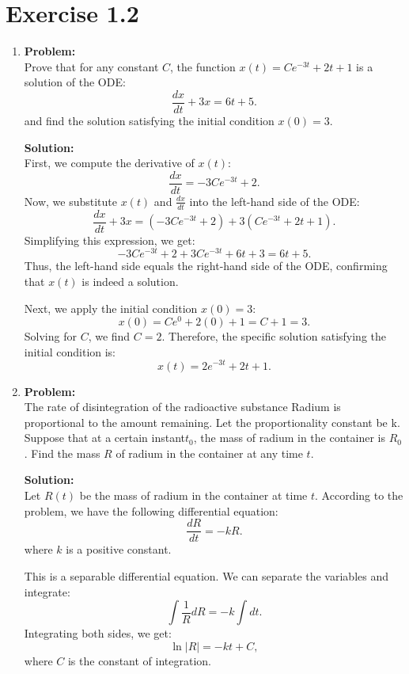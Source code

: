 \documentclass[12pt]{article}
\begin{document}
\begin{enumerate}[label=\textbf{Exercise \arabic*:}]
    \vspace{1em}


\end{enumerate}

\section{Exercise 1.2}

\begin{enumerate}[label=\textbf{Exercise \arabic*:}]
    \item
    \textbf{Problem:} \\
    Prove that for any constant $C$, the function $x(t)=Ce^{-3t}+2t+1$ is a solution of the ODE:
    $$\frac{dx}{dt}+3x=6t+5.$$
    and find the solution satisfying the initial condition $x(0)=3$.
    
    \textbf{Solution:} \\
    First, we compute the derivative of $x(t)$:
    $$\frac{dx}{dt} = -3Ce^{-3t}+2.$$
    Now, we substitute $x(t)$ and $\frac{dx}{dt}$ into the left-hand side of the ODE:
    $$\frac{dx}{dt}+3x = (-3Ce^{-3t}+2)+3(Ce^{-3t}+2t+1).$$
    Simplifying this expression, we get:
    $$-3Ce^{-3t}+2+3Ce^{-3t}+6t+3 = 6t+5.$$
    Thus, the left-hand side equals the right-hand side of the ODE, confirming that $x(t)$ is indeed a solution.

    Next, we apply the initial condition $x(0)=3$:
    $$x(0) = Ce^{0}+2(0)+1 = C+1 = 3.$$
    Solving for $C$, we find $C=2$. Therefore, the specific solution satisfying the initial condition is:
    $$x(t) = 2e^{-3t}+2t+1.$$

    \item
    \textbf{Problem:} \\
    The rate of disintegration of the radioactive substance Radium is 
    proportional to the amount remaining.  Let the proportionality 
    constant be k. Suppose that at a certain instant$t_0$, the mass of 
    radium in the container is $R_0$. Find the mass $R$ of radium in the container at any time $t$.

    \textbf{Solution:} \\
    Let $R(t)$ be the mass of radium in the container at time $t$. According to the problem, we have the following differential equation:
    $$\frac{dR}{dt} = -kR.$$
    where $k$ is a positive constant.

    This is a separable differential equation. We can separate the variables and integrate:
    $$\int \frac{1}{R} dR = -k \int dt.$$
    Integrating both sides, we get:
    $$\ln|R| = -kt + C,$$
    where $C$ is the constant of integration.


\end{enumerate}
\end{document}

